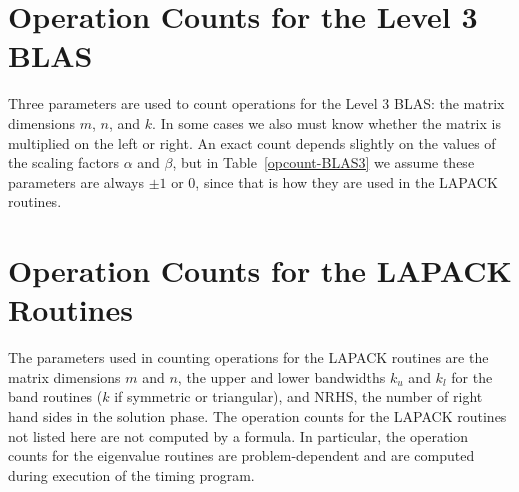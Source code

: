 \section*{Operation Counts for the Level 3 BLAS}
\dent
Three parameters are used to count operations for the Level 3 BLAS:
the matrix dimensions $m$, $n$, and $k$.  In some cases we also
must know whether the matrix is multiplied on the left or right.
An exact count depends slightly on the
values of the scaling factors $\alpha$ and $\beta$,
but in Table~\ref{opcount-BLAS3}
we assume these parameters are always $\pm 1$ or $0$, 
since that is how they are used in the LAPACK routines.

\section*{Operation Counts for the LAPACK Routines}
\dent
The parameters used in counting operations for the LAPACK routines
are the matrix dimensions $m$ and $n$, the upper and lower
bandwidths $k_u$ and $k_l$ for the band routines ($k$ if symmetric
or triangular), and NRHS, the number of right hand sides
in the solution phase.
The operation counts for the LAPACK routines not listed here
are not computed by a formula.  In particular, the operation
counts for the eigenvalue routines are problem-dependent
and are computed during execution of the timing program.

